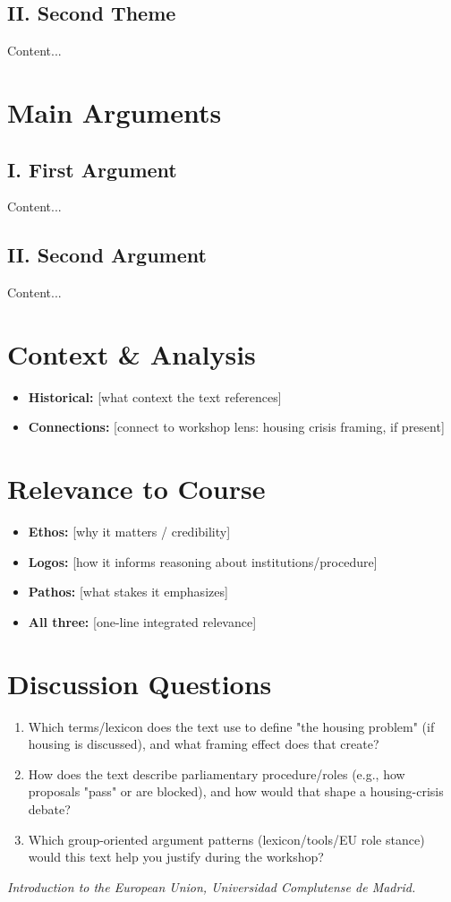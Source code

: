 \documentclass[11pt,a4paper]{article}
\begin{document}
\subsection*{II. Second Theme}
Content...

\section*{Main Arguments}
\subsection*{I. First Argument}
Content...

\subsection*{II. Second Argument}
Content...

\section*{Context \& Analysis}
\begin{itemize}
\item \textbf{Historical:} [what context the text references]
\item \textbf{Connections:} [connect to workshop lens: housing crisis framing, if present]
\end{itemize}

\section*{Relevance to Course}
\begin{itemize}
\item \textbf{Ethos:} [why it matters / credibility]
\item \textbf{Logos:} [how it informs reasoning about institutions/procedure]
\item \textbf{Pathos:} [what stakes it emphasizes]
\item \textbf{All three:} [one-line integrated relevance]
\end{itemize}

\section*{Discussion Questions}
\begin{enumerate}
\item Which terms/lexicon does the text use to define "the housing problem" (if housing is discussed), and what framing effect does that create?
\item How does the text describe parliamentary procedure/roles (e.g., how proposals "pass" or are blocked), and how would that shape a housing-crisis debate?
\item Which group-oriented argument patterns (lexicon/tools/EU role stance) would this text help you justify during the workshop?
\end{enumerate}

\vspace{1em}
\noindent\footnotesize\textit{Introduction to the European Union, Universidad Complutense de Madrid.}
\end{document}
